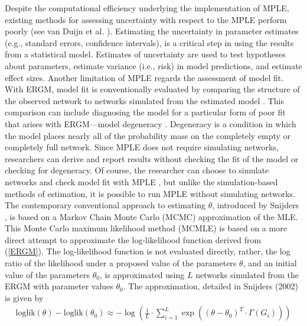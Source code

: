 \documentclass{llncs}
\begin{document}
Despite the computational efficiency underlying the implementation of MPLE,  existing methods for assessing uncertainty with respect to the MPLE perform poorly (see van Duijn et al. \cite{vanDuijnetal2009}). Estimating the uncertainty in parameter estimates (e.g., standard errors, confidence intervals), is a critical step in using the results from a statistical model. Estimates of uncertainty are used to test hypotheses about parameters, estimate variance (i.e., risk) in model predictions, and estimate effect sizes. Another limitation of MPLE regards the assessment of model fit. With ERGM, model fit is conventionally evaluated by comparing the structure of the observed network to networks simulated from the estimated model \cite{Hunter.2008}. This comparison can include diagnosing the model for a particular form of poor fit that arises with ERGM---model degeneracy \cite{schweinberger2011instability}. Degeneracy is a condition in which the model places nearly all of the probability mass on the completely empty or completely full network. Since MPLE does not require simulating networks, researchers can derive and report results without checking the fit of the model or checking for degeneracy. Of course, the researcher can choose to simulate networks and check model fit with MPLE , but unlike the simulation-based methods of estimation, it is possible to run MPLE without simulating networks.\\
\indent The contemporary conventional approach to estimating $\theta$, introduced by Snijders \cite{snijders2002markov}, is based on a Markov Chain Monte Carlo (MCMC) approximation of the MLE.
This Monte Carlo maximum likelihood method (MCMLE) is based on a more direct attempt to approximate the  log-likelihood function derived from (\ref{ERGM}). The log-likelihood function is not evaluated directly, rather, the log ratio of the likelihood under a proposed value of the parameters $\theta$, and an initial value of the parameters $\theta_0$, is approximated using $L$ networks simulated from the ERGM with parameter values $\theta_0$. The approximation, detailed in Snijders (2002) \cite{snijders2002markov} is given by 
%
\begin{eqnarray}
\text{loglik}(\theta)-\text{loglik}(\theta_0)\approx - 
\log \left( \frac{1}{L} \cdot \sum_{i=1}^{L}  \exp \left((\theta - \theta_0)^T \cdot \Gamma(G_i) \right) \right)
\end{eqnarray}
\end{document}
